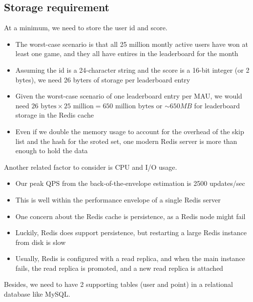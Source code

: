 \documentclass{report}
\theoremstyle{definition}
\let\oldsubsection\subsection
\renewcommand{\subsection}{\oldsubsection*}
\begin{document}
\subsection{Storage requirement}

At a minimum, we need to store the user id and score.

\begin{itemize}
\item
The worst-case scenario is that all 25 million montly active users have won at least one game, and they all have entires in the leaderboard for the month
\item
Assuming the id is a 24-character string and the score is a 16-bit integer (or 2 bytes), we need 26 byters of storage per leaderboard entry
\item
Given the worst-case scenario of one leaderboard entry per MAU, we would need $26 \text{ bytes} \times 25 \text{ million} = 650 \text{ million bytes}$ or $\sim 650 MB$ for leaderboard storage in the Redis cache
\item
Even if we double the memory usage to account for the overhead of the skip list and the hash for the sroted set, one modern Redis server is more than enough to hold the data
\end{itemize}

Another related factor to consider is CPU and I/O usage.

\begin{itemize}
\item
Our peak QPS from the back-of-the-envelope estimation is 2500 updates/sec
\item
This is well within the performance envelope of a single Redis server
\item
One concern about the Redis cache is persistence, as a Redis node might fail
\item
Luckily, Redis does support persistence, but restarting a large Redis instance from disk is slow
\item
Usually, Redis is configured with a read replica, and when the main instance fails, the read replica is promoted, and a new read replica is attached
\end{itemize}

Besides, we need to have 2 supporting tables (user and point) in a relational database like MySQL.
\end{document}
